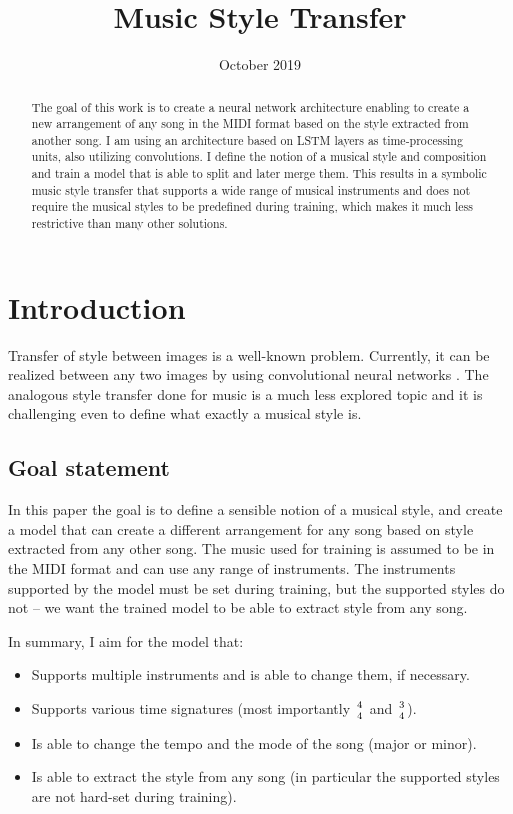 \documentclass[en]{pracamgr}
\title{Music Style Transfer}
\date{October 2019}
\begin{document}
\maketitle

\begin{abstract}
    The goal of this work is to create a neural network architecture enabling to create a new arrangement of any song in the MIDI format based on the style extracted from another song.
    I am using an architecture based on LSTM layers as time-processing units, also utilizing convolutions.
    I define the notion of a musical style and composition and train a model that is able to split and later merge them.
    This results in a symbolic music style transfer that supports a wide range of musical instruments and does not require the musical styles to be predefined during training, which makes it much less restrictive than many other solutions.
\end{abstract}

\tableofcontents
\listoffigures

\chapter{Introduction}

Transfer of style between images is a well-known problem.
Currently, it can be realized between any two images by using convolutional neural networks \cite{image_style_transfer}.
The analogous style transfer done for music is a much less explored topic and it is challenging even to define what exactly a musical style is.

\section{Goal statement}

In this paper the goal is to define a sensible notion of a musical style, and create a model that can create a different arrangement for any song based on style extracted from any other song.
The music used for training is assumed to be in the MIDI format and can use any range of instruments.
The instruments supported by the model must be set during training, but the supported styles do not -- we want the trained model to be able to extract style from any song.

In summary, I aim for the model that:

\begin{itemize}
    \item Supports multiple instruments and is able to change them, if necessary.
    \item Supports various time signatures (most importantly $4\atop4$ and $3\atop4$).
    \item Is able to change the tempo and the mode of the song (major or minor).
    \item Is able to extract the style from any song (in particular the supported styles are not hard-set during training).
\end{itemize}
\end{document}
